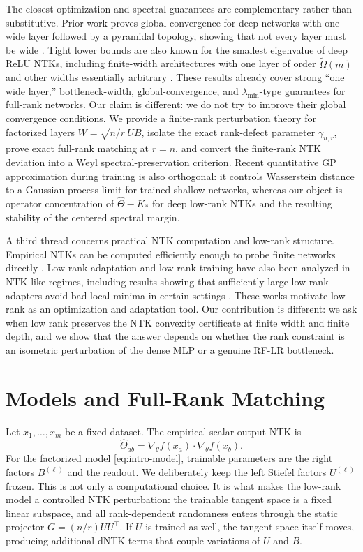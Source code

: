 \documentclass{article}
\newcommand{\wh}{\widehat}
\begin{document}
The closest optimization and spectral guarantees are complementary rather than substitutive. Prior work proves global convergence for deep networks with one wide layer followed by a pyramidal topology, showing that not every layer must be wide \citep{NguyenMondelli2020}. Tight lower bounds are also known for the smallest eigenvalue of deep ReLU NTKs, including finite-width architectures with one layer of order \(\widetilde\Omega(m)\) and other widths essentially arbitrary \citep{NguyenMondelliMontufar2022}. These results already cover strong ``one wide layer,'' bottleneck-width, global-convergence, and \(\lambda_{\min}\)-type guarantees for full-rank networks. Our claim is different: we do not try to improve their global convergence conditions. We provide a finite-rank perturbation theory for factorized layers \(W=\sqrt{n/r}\,UB\), isolate the exact rank-defect parameter \(\gamma_{n,r}\), prove exact full-rank matching at \(r=n\), and convert the finite-rank NTK deviation into a Weyl spectral-preservation criterion. Recent quantitative GP approximation during training \citep{MosigGarciaAgazziTrevisan2025} is also orthogonal: it controls Wasserstein distance to a Gaussian-process limit for trained shallow networks, whereas our object is operator concentration of \(\wh\Theta-K_*\) for deep low-rank NTKs and the resulting stability of the centered spectral margin.

A third thread concerns practical NTK computation and low-rank structure. Empirical NTKs can be computed efficiently enough to probe finite networks directly \citep{Novak2022}. Low-rank adaptation and low-rank training have also been analyzed in NTK-like regimes, including results showing that sufficiently large low-rank adapters avoid bad local minima in certain settings \citep{Zeng2024LoRA}. These works motivate low rank as an optimization and adaptation tool. Our contribution is different: we ask when low rank preserves the NTK convexity certificate at finite width and finite depth, and we show that the answer depends on whether the rank constraint is an isometric perturbation of the dense MLP or a genuine RF-LR bottleneck.

\section{Models and Full-Rank Matching}
Let \(x_1,\ldots,x_m\) be a fixed dataset. The empirical scalar-output NTK is
\begin{equation}
\wh\Theta_{ab}=\nabla_\theta f(x_a)\cdot \nabla_\theta f(x_b).
\end{equation}
For the factorized model \eqref{eq:intro-model}, trainable parameters are the right factors \(B^{(\ell)}\) and the readout.
We deliberately keep the left Stiefel factors \(U^{(\ell)}\) frozen. This is not only a computational choice. It is what makes the low-rank model a controlled NTK perturbation: the trainable tangent space is a fixed linear subspace, and all rank-dependent randomness enters through the static projector \(G=(n/r)UU^\top\). If \(U\) is trained as well, the tangent space itself moves, producing additional dNTK terms that couple variations of \(U\) and \(B\).
\end{document}
